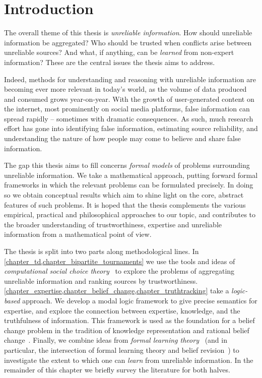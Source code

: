 \chapter{Introduction}

The overall theme of this thesis is \emph{unreliable information}. How should
unreliable information be aggregated? Who should be trusted when conflicts
arise between unreliable sources? And what, if anything, can be \emph{learned}
from non-expert information? These are the central issues the thesis aims to
address.

Indeed, methods for understanding and reasoning with unreliable information are
becoming ever more relevant in today's world, as the volume of data produced
and consumed grows year-on-year. With the growth of user-generated
content on the internet, most prominently on social media platforms, false
information can spread rapidly -- sometimes with dramatic
consequences. As such, much research effort has gone into identifying
false information, estimating source reliability, and understanding the nature
of how people may come to believe and share false information.

The gap this thesis aims to fill concerns \emph{formal models} of problems
surrounding unreliable information. We take a mathematical approach, putting
forward formal frameworks in which the relevant problems can be formulated
precisely. In doing so we obtain conceptual results which aim to shine light on
the core, abstract features of such problems. It is hoped that the thesis
complements the various empirical, practical and philosophical approaches
to our topic, and contributes to the broader understanding of
trustworthiness, expertise and unreliable information from a mathematical point
of view.

The thesis is split into two parts along methodological lines. In
\cref{chapter_td,chapter_bipartite_tournaments} we use the tools and ideas of
\emph{computational social choice theory}~\cite{brandt2016introduction} to
explore the problems of aggregating unreliable information and ranking sources
by trustworthiness.
%
\cref{chapter_expertise,chapter_belief_change,chapter_truthtracking} take a
\emph{logic-based} approach. We develop a modal logic framework to give precise
semantics for expertise, and explore the connection between expertise,
knowledge, and the truthfulness of information. This framework is used as the
foundation for a belief change problem in the tradition of knowledge
representation and rational belief
change~\cite{booth_belief_2011,sep_belief_change,ferme_2018}. Finally, we
combine ideas from \emph{formal learning
theory}~\cites{jain1999systems}[]{gierasimczuk2010knowing}
(and in particular, the intersection of formal learning theory and belief
revision~\cite{baltag_tt_2019}) to investigate the extent to which one can
\emph{learn} from unreliable information.
%
In the remainder of this chapter we briefly survey the literature for both
halves.

